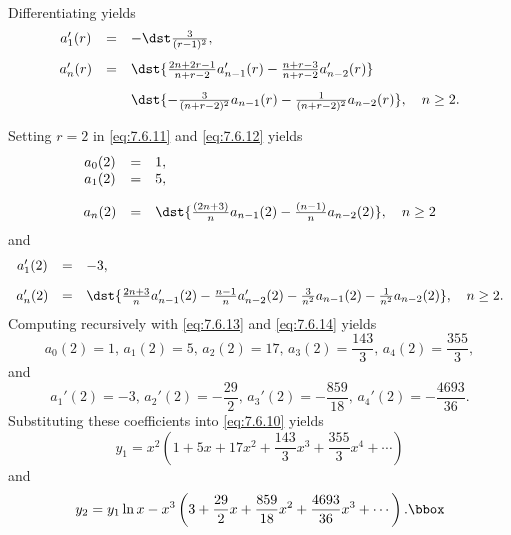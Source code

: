 \begin{examplesolution}
\begin{equation}
\begin{array}{ccl}
  \end{array}
\end{equation}
Differentiating yields
\begin{equation}
  \label{eq:7.6.12}
  \begin{array}{ccl}
    a'_{1}(r) & = & -\dst\frac{3}{(r-1)^{2}},                                                           \\[10pt]
    a'_{n}(r) & = & \dst{\frac{2n+2r-1}{n+r-2}a'_{n-1}(r)-\frac{n+r-3}{n+r-2}a'_{n-2}(r)}               \\[10pt]
              &   & \dst{-\frac{3}{(n+r-2)^{2}}a_{n-1}(r)-\frac{1}{(n+r-2)^{2}}a_{n-2}(r)},\quad n\ge2.
  \end{array}
\end{equation}

Setting $r=2$ in \eqref{eq:7.6.11} and \eqref{eq:7.6.12} yields
\begin{equation}
  \label{eq:7.6.13}
  \begin{array}{ccl}
    a_{0}(2) & = & 1,                                                                      \\
    a_{1}(2) & = & 5,                                                                      \\[10pt]
    a_{n}(2) & = & \dst{\frac{(2n+3)}{n} a_{n-1}(2)-\frac{(n-1)}{n}a_{n-2}(2)},\quad n\ge2
  \end{array}
\end{equation}
and
\begin{equation}
  \label{eq:7.6.14}
  \begin{array}{ccl}
    a_{1}'(2) & = & -3,                                                                                                                        \\[10pt]
    a'_{n}(2) & = & \dst{\frac{2n+3}{n}a'_{n-1}(2)-\frac{n-1}{n}a'_{n-2}(2) -\frac{3}{n^{2}}a_{n-1}(2)-\frac{1}{n^{2}}a_{n-2}(2)},\quad n\ge2.
  \end{array}
\end{equation}
Computing recursively with \eqref{eq:7.6.13} and \eqref{eq:7.6.14} yields
\[
  a_{0}(2)=1,\,a_{1}(2)=5,\,a_{2}(2)=17,\,a_{3}(2)=\frac{143}{3},\,a_{4}(2)=\frac{355}{3},
\]
and
\[
  a_{1}'(2)=-3,\,a_{2}'(2)=-\frac{29}{2},\,a_{3}'(2)=-\frac{859}{18}, \,a_{4}'(2)=-\frac{4693}{36}.
\]
Substituting these coefficients into \eqref{eq:7.6.10} yields
\[
  y_{1}=x^{2}\left(1+5x+17x^{2}+\frac{143}{3}x^{3}+\frac{355}{3}x^{4}+\cdots\right)
\]
and
\[
  y_{2}=y_{1}\ln x -x^{3}\left(3+\frac{29}{2}x+\frac{859}{18}x^{2}+\frac{4693}{36}x^{3}+\cdots\right).\bbox
\]
\end{examplesolution}

